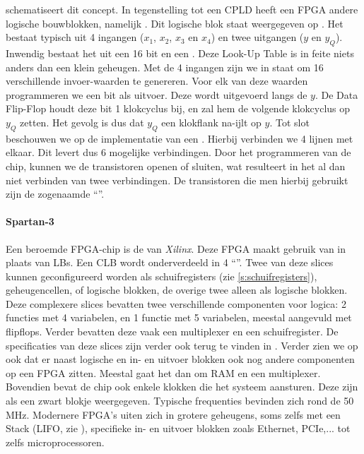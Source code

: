 schematiseert dit concept. In tegenstelling tot een CPLD heeft een FPGA andere logische bouwblokken, namelijk . Dit logische blok staat weergegeven op . Het bestaat typisch uit 4 ingangen ($x_1$, $x_2$, $x_3$ en $x_4$) en twee uitgangen ($y$ en $y_Q$). Inwendig bestaat het uit een 16 bit  en een . Deze Look-Up Table is in feite niets anders dan een klein geheugen. Met de 4 ingangen zijn we in staat om 16 verschillende invoer-waarden te genereren. Voor elk van deze waarden programmeren we een bit als uitvoer. Deze wordt uitgevoerd langs de $y$. De Data Flip-Flop houdt deze bit 1 klokcyclus bij, en zal hem de volgende klokcyclus op $y_Q$ zetten. Het gevolg is dus dat $y_Q$ een klokflank na-ijlt op $y$. Tot slot beschouwen we op  de implementatie van een . Hierbij verbinden we 4 lijnen met elkaar. Dit levert dus 6 mogelijke verbindingen. Door het programmeren van de chip, kunnen we de transistoren openen of sluiten, wat resulteert in het al dan niet verbinden van twee verbindingen. De transistoren die men hierbij gebruikt zijn de zogenaamde ``''.
\paragraph{Spartan-3}
Een beroemde FPGA-chip is de  van \emph{Xilinx}. Deze FPGA maakt gebruik van  in plaats van LBs. Een CLB wordt onderverdeeld in 4 ``''. Twee van deze slices kunnen geconfigureerd worden als schuifregisters (zie \ref{s:schuifregisters}), geheugencellen, of logische blokken, de overige twee alleen als logische blokken. Deze complexere slices bevatten twee verschillende componenten voor logica: 2 functies met 4 variabelen, en 1 functie met 5 variabelen, meestal aangevuld met flipflops. Verder bevatten deze vaak een multiplexer en een schuifregister. De specificaties van deze slices zijn verder ook terug te vinden in \cite[p.~22-23]{xilinxFpgaDs099}. Verder zien we op  ook dat er naast logische en in- en uitvoer blokken ook nog andere componenten op een FPGA zitten. Meestal gaat het dan om RAM en een multiplexer. Bovendien bevat de chip ook enkele klokken die het systeem aansturen. Deze zijn als een zwart blokje weergegeven. Typische frequenties bevinden zich rond de 50 MHz. Modernere FPGA's uiten zich in grotere geheugens, soms zelfs met een Stack (LIFO, zie ), specifieke in- en uitvoer blokken zoals Ethernet, PCIe,... tot zelfs microprocessoren.
